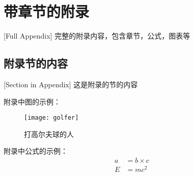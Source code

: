 
\chapter{带章节的附录}[Full Appendix]%
完整的附录内容，包含章节，公式，图表等

\section{附录节的内容}[Section in Appendix]
这是附录的节的内容

附录中图的示例：
\begin{figure}[htbp]
\centering
\texttt{[image: golfer]}
\caption{\xiaosi[0]打高尔夫球的人}
\end{figure}

附录中公式的示例：
\begin{align}
a & = b \times c \\
E & = m c^2
\label{eq}
\end{align}
